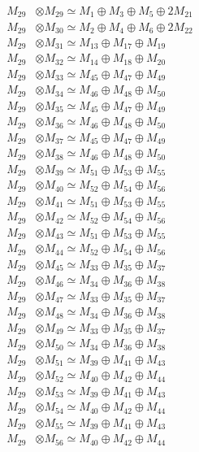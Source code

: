 \begin{align*}
M_{29} &\otimes M_{29} \simeq M_{1} \oplus M_{3} \oplus M_{5} \oplus 2M_{21} \\
M_{29} &\otimes M_{30} \simeq M_{2} \oplus M_{4} \oplus M_{6} \oplus 2M_{22} \\
M_{29} &\otimes M_{31} \simeq M_{13} \oplus M_{17} \oplus M_{19} \\
M_{29} &\otimes M_{32} \simeq M_{14} \oplus M_{18} \oplus M_{20} \\
M_{29} &\otimes M_{33} \simeq M_{45} \oplus M_{47} \oplus M_{49} \\
M_{29} &\otimes M_{34} \simeq M_{46} \oplus M_{48} \oplus M_{50} \\
M_{29} &\otimes M_{35} \simeq M_{45} \oplus M_{47} \oplus M_{49} \\
M_{29} &\otimes M_{36} \simeq M_{46} \oplus M_{48} \oplus M_{50} \\
M_{29} &\otimes M_{37} \simeq M_{45} \oplus M_{47} \oplus M_{49} \\
M_{29} &\otimes M_{38} \simeq M_{46} \oplus M_{48} \oplus M_{50} \\
M_{29} &\otimes M_{39} \simeq M_{51} \oplus M_{53} \oplus M_{55} \\
M_{29} &\otimes M_{40} \simeq M_{52} \oplus M_{54} \oplus M_{56} \\
M_{29} &\otimes M_{41} \simeq M_{51} \oplus M_{53} \oplus M_{55} \\
M_{29} &\otimes M_{42} \simeq M_{52} \oplus M_{54} \oplus M_{56} \\
M_{29} &\otimes M_{43} \simeq M_{51} \oplus M_{53} \oplus M_{55} \\
M_{29} &\otimes M_{44} \simeq M_{52} \oplus M_{54} \oplus M_{56} \\
M_{29} &\otimes M_{45} \simeq M_{33} \oplus M_{35} \oplus M_{37} \\
M_{29} &\otimes M_{46} \simeq M_{34} \oplus M_{36} \oplus M_{38} \\
M_{29} &\otimes M_{47} \simeq M_{33} \oplus M_{35} \oplus M_{37} \\
M_{29} &\otimes M_{48} \simeq M_{34} \oplus M_{36} \oplus M_{38} \\
M_{29} &\otimes M_{49} \simeq M_{33} \oplus M_{35} \oplus M_{37} \\
M_{29} &\otimes M_{50} \simeq M_{34} \oplus M_{36} \oplus M_{38} \\
M_{29} &\otimes M_{51} \simeq M_{39} \oplus M_{41} \oplus M_{43} \\
M_{29} &\otimes M_{52} \simeq M_{40} \oplus M_{42} \oplus M_{44} \\
M_{29} &\otimes M_{53} \simeq M_{39} \oplus M_{41} \oplus M_{43} \\
M_{29} &\otimes M_{54} \simeq M_{40} \oplus M_{42} \oplus M_{44} \\
M_{29} &\otimes M_{55} \simeq M_{39} \oplus M_{41} \oplus M_{43} \\
M_{29} &\otimes M_{56} \simeq M_{40} \oplus M_{42} \oplus M_{44} \\
\end{align*}

